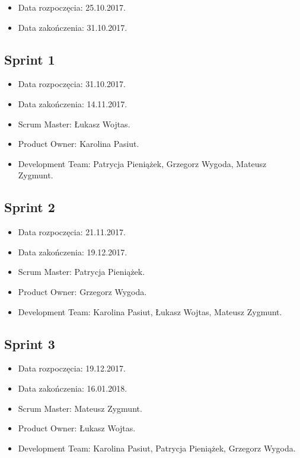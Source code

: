 \documentclass[a4paper]{article}
\begin{document}
\begin{itemize}
\item Data rozpoczęcia: 25.10.2017.
\item  Data zakończenia: 31.10.2017.
\end{itemize}

\subsection{Sprint 1}

\begin{itemize}
\item Data rozpoczęcia: 31.10.2017.
\item Data zakończenia: 14.11.2017.
\item Scrum Master: Łukasz Wojtas.
\item Product Owner: Karolina Pasiut.
\item Development Team: Patrycja Pieniążek, Grzegorz Wygoda, Mateusz Zygmunt.
\end{itemize}

\subsection{Sprint 2}

\begin{itemize}
\item Data rozpoczęcia: 21.11.2017.
\item  Data zakończenia: 19.12.2017.
\item Scrum Master: Patrycja Pieniążek.
\item Product Owner: Grzegorz Wygoda.
\item Development Team: Karolina Pasiut, Łukasz Wojtas, Mateusz Zygmunt.
\end{itemize}

\subsection{Sprint 3}

\begin{itemize}
\item Data rozpoczęcia: 19.12.2017.
\item  Data zakończenia: 16.01.2018.
\item Scrum Master: Mateusz Zygmunt.
\item Product Owner: Łukasz Wojtas.
\item Development Team: Karolina Pasiut, Patrycja Pieniążek, Grzegorz Wygoda.
\end{itemize}
\end{document}
